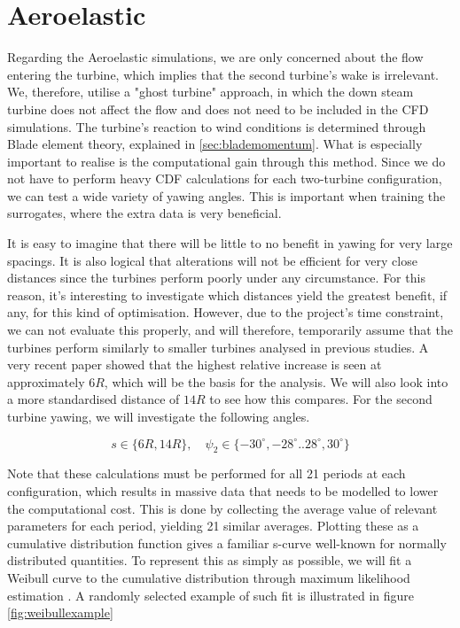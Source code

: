 \section{Aeroelastic}
\label{sec:Aeroelastic}

Regarding the Aeroelastic simulations, we are only concerned about the flow entering the turbine, which implies that the second turbine's wake is irrelevant. We, therefore, utilise a "ghost turbine" approach, in which the down steam turbine does not affect the flow and does not need to be included in the CFD simulations. The turbine's reaction to wind conditions is determined through Blade element theory, explained in \ref{sec:blademomentum}. What is especially important to realise is the computational gain through this method. Since we do not have to perform heavy CDF calculations for each two-turbine configuration, we can test a wide variety of yawing angles. This is important when training the surrogates, where the extra data is very beneficial. 

It is easy to imagine that there will be little to no benefit in yawing for very large spacings. It is also logical that alterations will not be efficient for very close distances since the turbines perform poorly under any circumstance. For this reason, it's interesting to investigate which distances yield the greatest benefit, if any, for this kind of optimisation. However, due to the project's time constraint, we can not evaluate this properly, and will therefore, temporarily assume that the turbines perform similarly to smaller turbines analysed in previous studies. A very recent paper \cite{charles} showed that the highest relative increase is seen at approximately $6R$, which will be the basis for the analysis. We will also look into a more standardised distance of $14R$ to see how this compares. For the second turbine yawing, we will investigate the following angles. 

\begin{equation*}
    s \in \{ 6R, 14R\}, \quad \psi_2 \in \{ -30^\circ,-28^\circ..28^\circ, 30^\circ \}
\end{equation*}

Note that these calculations must be performed for all 21 periods at each configuration, which results in massive data that needs to be modelled to lower the computational cost. This is done by collecting the average value of relevant parameters for each period, yielding 21 similar averages. Plotting these as a cumulative distribution function gives a familiar s-curve well-known for normally distributed quantities. To represent this as simply as possible, we will fit a Weibull curve to the cumulative distribution through maximum likelihood estimation \cite{maxlikelihood}. A randomly selected example of such fit is illustrated in figure \ref{fig:weibullexample}

